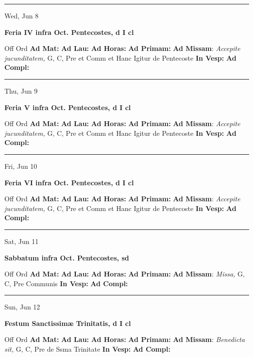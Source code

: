 \documentclass[letterpaper, 10pt]{article}
\begin{document}
\hrule
\begin{center}
Wed, Jun 8
\end{center}\textbf{ \large Feria IV infra Oct. Pentecostes, \textnormal{\normalsize d I cl}}
\begin{justify}
Off Ord
\textbf{Ad Mat: }
\textbf{Ad Lau: }
\textbf{Ad Horas: }
\textbf{Ad Primam: }
\textbf{Ad Missam}: \textit{Accepite jucunditatem,} G, C, Pre et Comm et Hanc Igitur de Pentecoste
\textbf{In Vesp: }
\textbf{Ad Compl: }\end{justify}



\hrule
\begin{center}
Thu, Jun 9
\end{center}\textbf{ \large Feria V infra Oct. Pentecostes, \textnormal{\normalsize d I cl}}
\begin{justify}
Off Ord
\textbf{Ad Mat: }
\textbf{Ad Lau: }
\textbf{Ad Horas: }
\textbf{Ad Primam: }
\textbf{Ad Missam}: \textit{Accepite jucunditatem,} G, C, Pre et Comm et Hanc Igitur de Pentecoste
\textbf{In Vesp: }
\textbf{Ad Compl: }\end{justify}



\hrule
\begin{center}
Fri, Jun 10
\end{center}\textbf{ \large Feria VI infra Oct. Pentecostes, \textnormal{\normalsize d I cl}}
\begin{justify}
Off Ord
\textbf{Ad Mat: }
\textbf{Ad Lau: }
\textbf{Ad Horas: }
\textbf{Ad Primam: }
\textbf{Ad Missam}: \textit{Accepite jucunditatem,} G, C, Pre et Comm et Hanc Igitur de Pentecoste
\textbf{In Vesp: }
\textbf{Ad Compl: }\end{justify}



\hrule
\begin{center}
Sat, Jun 11
\end{center}\textbf{ \large Sabbatum infra Oct. Pentecostes, \textnormal{\normalsize sd}}
\begin{justify}
Off Ord
\textbf{Ad Mat: }
\textbf{Ad Lau: }
\textbf{Ad Horas: }
\textbf{Ad Primam: }
\textbf{Ad Missam}: \textit{Missa,} G, C, Pre Communis
\textbf{In Vesp: }
\textbf{Ad Compl: }\end{justify}



\hrule
\begin{center}
Sun, Jun 12
\end{center}\textbf{ \large Festum Sanctissimæ Trinitatis, \textnormal{\normalsize d I cl}}
\begin{justify}
Off Ord
\textbf{Ad Mat: }
\textbf{Ad Lau: }
\textbf{Ad Horas: }
\textbf{Ad Primam: }
\textbf{Ad Missam}: \textit{Benedicta sit,} G, C, Pre de Ssma Trinitate
\textbf{In Vesp: }
\textbf{Ad Compl: }\end{justify}
\end{document}

